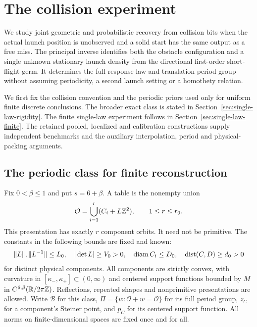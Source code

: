 \section{The collision experiment}
\label{sec:setting}
We study joint geometric and probabilistic recovery from collision bits
when the actual launch position is unobserved and a solid start has the
same output as a free miss. The principal inverse identifies both the
obstacle configuration and a single unknown stationary launch density
from the directional first-order short-flight germ. It determines the
full response law and translation period group without assuming
periodicity, a second launch setting or a homothety relation.

We first fix the collision convention and the periodic priors used
only for uniform finite discrete conclusions. The broader exact class
is stated in Section~\ref{sec:single-law-rigidity}. The finite
single-law experiment follows in Section~\ref{sec:single-law-finite}.
The retained pooled, localized and calibration constructions supply
independent benchmarks and the auxiliary interpolation, period and
physical-packing arguments.

\subsection{The periodic class for finite reconstruction}
Fix $0<\beta\le1$ and put $s=6+\beta$. A table is the nonempty union
\begin{equation}\label{eq:presentation}
 \mathcal O=\bigcup_{i=1}^r(C_i+L\mathbb Z^2),\qquad 1\le r\le r_0.
\end{equation}
This presentation has exactly $r$ component orbits. It need not be
primitive. The constants in the following bounds are fixed and known:
\begin{equation}\label{eq:priors}
 \|L\|,\|L^{-1}\|\le L_0,\quad |\det L|\ge V_0>0,\quad
 \operatorname{diam} C_i\le D_0,\quad \operatorname{dist}(C,D)\ge d_0>0
\end{equation}
for distinct physical components. All components are strictly convex,
with curvature in $[\kappa_-,\kappa_+]\subset(0,\infty)$ and centered
support functions bounded by $M$ in $C^{6,\beta}(\mathbb R/2\pi\mathbb Z)$.
Reflections, repeated shapes and nonprimitive presentations are allowed.
Write $\mathcal B$ for this class, $\Pi=\{w:\mathcal O+w=\mathcal O\}$
for its full period group, $z_C$ for a component's Steiner point, and
$p_C$ for its centered support function. All norms on finite-dimensional
spaces are fixed once and for all.

